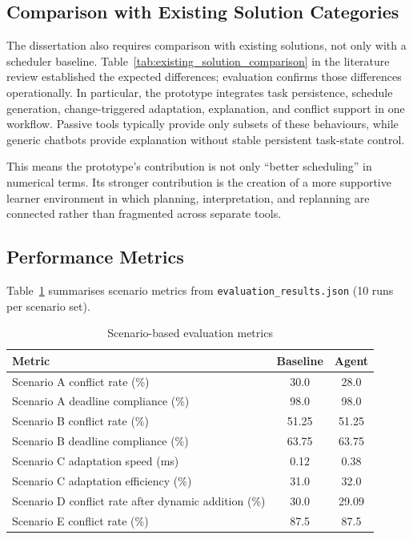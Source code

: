 \documentclass[12pt]{article}
\begin{document}
\subsection{Comparison with Existing Solution Categories}
The dissertation also requires comparison with existing solutions, not only with a scheduler baseline. Table~\ref{tab:existing_solution_comparison} in the literature review established the expected differences; evaluation confirms those differences operationally. In particular, the prototype integrates task persistence, schedule generation, change-triggered adaptation, explanation, and conflict support in one workflow. Passive tools typically provide only subsets of these behaviours, while generic chatbots provide explanation without stable persistent task-state control.

This means the prototype's contribution is not only ``better scheduling'' in numerical terms. Its stronger contribution is the creation of a more supportive learner environment in which planning, interpretation, and replanning are connected rather than fragmented across separate tools.

\subsection{Performance Metrics}

Table~\ref{tab:performance} summarises scenario metrics from \texttt{evaluation\_results.json} (10 runs per scenario set).

\begin{table}[h!]
\centering
\small
\begin{tabular}{|l|c|c|}
\hline
\textbf{Metric} & \textbf{Baseline} & \textbf{Agent} \\
\hline
Scenario A conflict rate (\%) & 30.0 & 28.0 \\
\hline
Scenario A deadline compliance (\%) & 98.0 & 98.0 \\
\hline
Scenario B conflict rate (\%) & 51.25 & 51.25 \\
\hline
Scenario B deadline compliance (\%) & 63.75 & 63.75 \\
\hline
Scenario C adaptation speed (ms) & 0.12 & 0.38 \\
\hline
Scenario C adaptation efficiency (\%) & 31.0 & 32.0 \\
\hline
Scenario D conflict rate after dynamic addition (\%) & 30.0 & 29.09 \\
\hline
Scenario E conflict rate (\%) & 87.5 & 87.5 \\
\hline
\end{tabular}
\caption{Scenario-based evaluation metrics}
\label{tab:performance}
\end{table}
\end{document}
